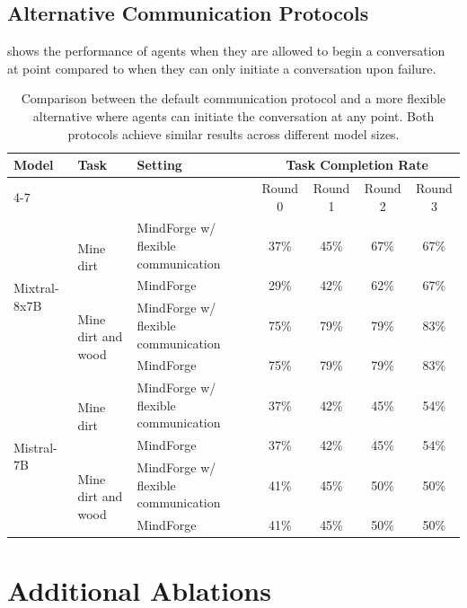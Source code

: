 \subsection{Alternative Communication Protocols}
\label{appendix:additional}
 shows the performance of \collabvoyager agents when they are allowed to begin a conversation at point compared to when they can only initiate a conversation upon failure.

\begin{table}[hbt]
    \centering
    \caption{Comparison between the default \collabvoyager communication protocol and a more flexible alternative where agents can initiate the conversation at any point. Both protocols achieve similar results across different model sizes.}
    \label{tab:flexible-communication}
    \scriptsize
    \def\arraystretch{1.2}
    \begin{tabular}{@{}lllcccc@{}}
    \toprule
    \multirow{2}{*}{Model} & \multirow{2}{*}{Task} & \multirow{2}{*}{Setting} & \multicolumn{4}{c}{Task Completion Rate} \\
    \cmidrule(l){4-7}
    & & & Round 0 & Round 1 & Round 2 & Round 3 \\
    \midrule
    \multirow{4}{*}{Mixtral-8x7B} & \multirow{2}{*}{Mine dirt} & MindForge w/ flexible communication & 37\% & 45\% & 67\% & 67\% \\
    & & MindForge & 29\% & 42\% & 62\% & 67\% \\
    \cmidrule(l){2-7}
    & \multirow{2}{*}{Mine dirt and wood} & MindForge w/ flexible communication & 75\% & 79\% & 79\% & 83\% \\
    & & MindForge & 75\% & 79\% & 79\% & 83\% \\
    \midrule
    \multirow{4}{*}{Mistral-7B} & \multirow{2}{*}{Mine dirt} & MindForge w/ flexible communication & 37\% & 42\% & 45\% & 54\% \\
    & & MindForge & 37\% & 42\% & 45\% & 54\% \\
    \cmidrule(l){2-7}
    & \multirow{2}{*}{Mine dirt and wood} & MindForge w/ flexible communication & 41\% & 45\% & 50\% & 50\% \\
    & & MindForge & 41\% & 45\% & 50\% & 50\% \\
    \bottomrule
    \end{tabular}
\end{table}

\section{Additional Ablations}\label{appx:additional-ablations}

